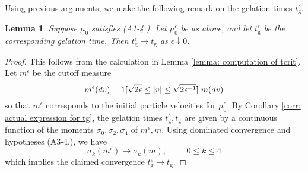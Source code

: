 \documentclass[11pt, notitlepage]{article}
\newtheorem{lem}[thm]{Lemma}
\begin{document}
Using previous arguments, we make the following remark on the gelation times $t^\epsilon_\mathrm{g}$.

\begin{lem}\label{lemma: continuity of tcrit} Suppose $\mu_0$ satisfies (A1-4.). Let $\mu^\epsilon_0$ be as above, and let $t^\epsilon_\mathrm{g}$ be the corresponding gelation time. Then $t^\epsilon_\mathrm{g}\rightarrow t_\mathrm{g}$ as $\epsilon \downarrow 0$.  \end{lem}\begin{proof} This follows from the calculation in Lemma \ref{lemma: computation of tcrit}. Let $m^\epsilon$ be the cutoff measure \begin{equation} m^\epsilon(dv)=1[\sqrt{2\epsilon}\le|v|\le\sqrt{2\epsilon^{-1}}]\hspace{0.1cm}m(dv) \end{equation} so that $m^\epsilon$ corresponds to the initial particle velocities for $\mu^\epsilon_0$. By Corollary \ref{corr: actual expression for tg}, the gelation times $t^\epsilon_\mathrm{g}, t_\mathrm{g}$ are given by a continuous function of the moments $\sigma_0, \sigma_2, \sigma_4$ of $m^\epsilon, m$.  Using dominated convergence and hypotheses (A3-4.), we have \begin{equation} \sigma_k(m^\epsilon)\rightarrow \sigma_k(m);\hspace{1cm}0\le k\le 4 \end{equation} which implies the claimed convergence $t^\epsilon_\mathrm{g}\rightarrow t_\mathrm{g}.$ \end{proof}
\end{document}
